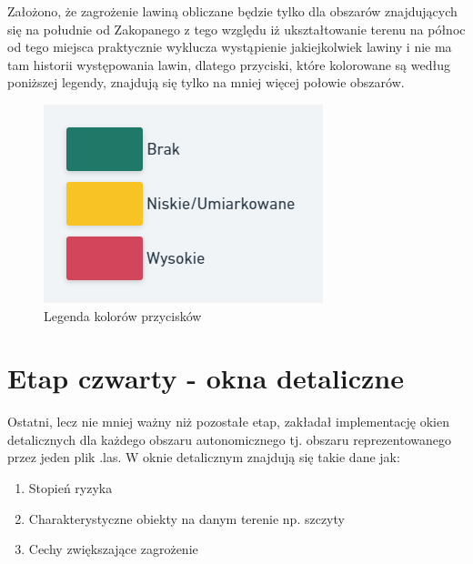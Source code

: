 Założono, że zagrożenie lawiną obliczane będzie tylko dla obszarów znajdujących się na południe od Zakopanego z tego względu iż ukształtowanie terenu na północ od tego miejsca praktycznie wyklucza wystąpienie jakiejkolwiek lawiny i nie ma tam historii występowania lawin, dlatego przyciski, które kolorowane są według poniższej legendy, znajdują się tylko na mniej więcej połowie obszarów. 
\begingroup
\begin{figure}[h]
	\centering
	\includegraphics[scale=0.6]{kolorowanie.png}
	\caption{Legenda kolorów przycisków}
\end{figure}
\endgroup


\clearpage
\section{Etap czwarty - okna detaliczne}
Ostatni, lecz nie mniej ważny niż pozostałe etap, zakładał implementację okien detalicznych dla każdego obszaru autonomicznego tj. obszaru reprezentowanego przez jeden plik .las. W oknie detalicznym znajdują się takie dane jak:
\begin{enumerate}[label=-]
	\item Stopień ryzyka
	\item Charakterystyczne obiekty na danym terenie np. szczyty
	\item Cechy zwiększające zagrożenie
\end{enumerate}

